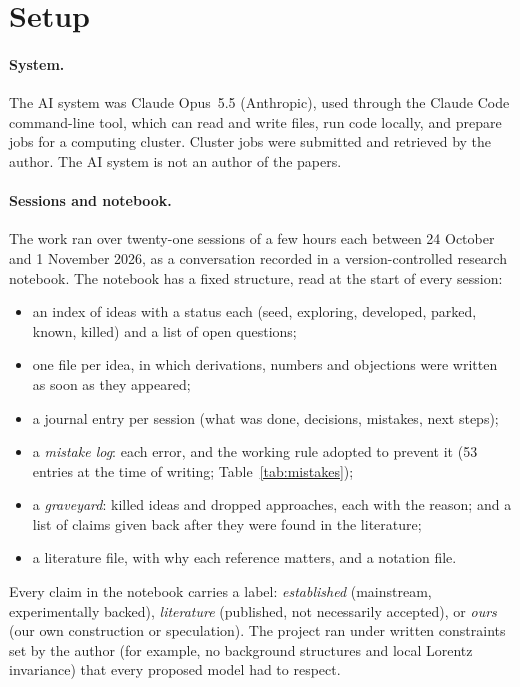 \documentclass[11pt,a4paper]{article}
\begin{document}
\section{Setup}
\paragraph{System.} The AI system was Claude Opus~5.5 (Anthropic), used through the Claude Code command-line tool, which can read and write files, run code locally, and prepare jobs for a computing cluster. Cluster jobs were submitted and retrieved by the author. The AI system is not an author of the papers.

\paragraph{Sessions and notebook.} The work ran over twenty-one sessions of a few hours each between 24 October and 1 November 2026, as a conversation recorded in a version-controlled research notebook. The notebook has a fixed structure, read at the start of every session:
\begin{itemize}[itemsep=1pt]
\item an index of ideas with a status each (seed, exploring, developed, parked, known, killed) and a list of open questions;
\item one file per idea, in which derivations, numbers and objections were written as soon as they appeared;
\item a journal entry per session (what was done, decisions, mistakes, next steps);
\item a \emph{mistake log}: each error, and the working rule adopted to prevent it (53 entries at the time of writing; Table~\ref{tab:mistakes});
\item a \emph{graveyard}: killed ideas and dropped approaches, each with the reason; and a list of claims given back after they were found in the literature;
\item a literature file, with why each reference matters, and a notation file.
\end{itemize}
Every claim in the notebook carries a label: \emph{established} (mainstream, experimentally backed), \emph{literature} (published, not necessarily accepted), or \emph{ours} (our own construction or speculation). The project ran under written constraints set by the author (for example, no background structures and local Lorentz invariance) that every proposed model had to respect.
\end{document}
